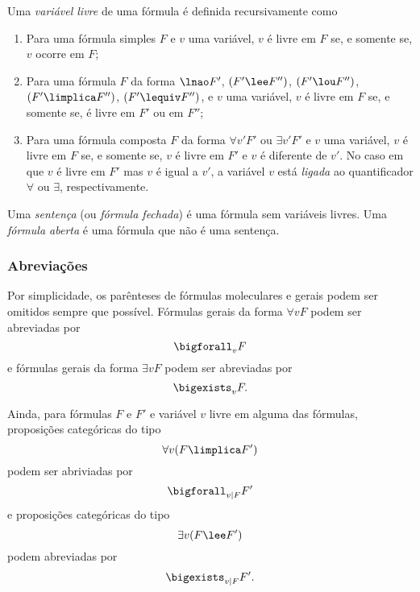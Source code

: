 Uma \emph{variável livre} de uma fórmula é definida recursivamente como
	\begin{enumerate}
	\item Para uma fórmula simples $F$ e $v$ uma variável, $v$ é livre em $F$ se, e somente se, $v$ ocorre em $F$;
	
	\item Para uma fórmula $F$ da forma $\lnao F'$, $(F' \lee F'')$, $(F' \lou F'')$, $(F' \limplica F'')$, $(F' \lequiv F'')$, e $v$ uma variável, $v$ é livre em $F$ se, e somente se, é livre em $F'$ ou em $F''$;
	
	\item Para uma fórmula composta $F$ da forma $\forall v' F'$ ou $\exists v' F'$ e $v$ uma variável, $v$ é livre em $F$ se, e somente se, $v$ é livre em $F'$ e $v$ é diferente de $v'$. No caso em que $v$ é livre em $F'$ mas $v$ é igual a $v'$, a variável $v$ está \emph{ligada} ao quantificador $\forall$ ou $\exists$, respectivamente.
	\end{enumerate}

Uma \emph{sentença} (ou \emph{fórmula fechada}) é uma fórmula sem variáveis livres. Uma \emph{fórmula aberta} é uma fórmula que não é uma sentença.

\subsubsection{Abreviações}

Por simplicidade, os parênteses de fórmulas moleculares e gerais podem ser omitidos sempre que possível. Fórmulas gerais da forma $\forall v F$ podem ser abreviadas por
	\begin{equation*}
	\bigforall_v F
	\end{equation*}
e fórmulas gerais da forma $\exists v F$ podem ser abreviadas por
	\begin{equation*}
	\bigexists_v F.
	\end{equation*}

Ainda, para fórmulas $F$ e $F'$ e variável $v$ livre em alguma das fórmulas, proposições categóricas do tipo
	\begin{equation*}
	\forall v(F \limplica F')
	\end{equation*}
podem ser abriviadas por
	\begin{equation*}
	\bigforall_{v | F} F'
	\end{equation*}
e proposições categóricas do tipo
	\begin{equation*}
	\exists v(F \lee F')
	\end{equation*}
podem abreviadas por
	\begin{equation*}
	\bigexists_{v | F} F'.
	\end{equation*}

